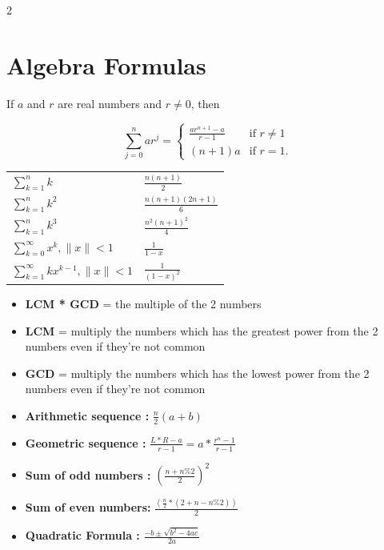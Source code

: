 \documentclass[10pt,a4paper]{extarticle}
\begin{document}
\begin{landscape}
\begin{multicols}{2}
\section{Algebra Formulas}

If $a$ and $r$ are real numbers and $r \neq 0$, then

$$\sum_{j=0}^{n} ar^j = \begin{cases} \frac{ar^{n+1}-a}{r-1} & \text{if } r \neq 1 \\ (n+1)a & \text{if } r = 1. \end{cases}$$

\begin{center}
\renewcommand{\arraystretch}{1.5}
\begin{tabular}{ll}
$\sum_{k=1}^{n} k$ & $\frac{n(n+1)}{2}$ \\
$\sum_{k=1}^{n} k^2$ & $\frac{n(n+1)(2n+1)}{6}$ \\
$\sum_{k=1}^{n} k^3$ & $\frac{n^2(n+1)^2}{4}$ \\
$\sum_{k=0}^{\infty} x^k, \|x\| < 1$ & $\frac{1}{1-x}$ \\
$\sum_{k=1}^{\infty} kx^{k-1}, \|x\| < 1$ & $\frac{1}{(1-x)^2}$ \\
\end{tabular}
\end{center}

\begin{itemize}
    \item \textbf{LCM * GCD} = the multiple of the 2 numbers
    \item \textbf{LCM} = multiply the numbers which has the greatest power from the 2 numbers even if they're not common
    \item \textbf{GCD} = multiply the numbers which has the lowest power from the 2 numbers even if they're not common
    \item \textbf{Arithmetic sequence :} $\frac{n}{2}(a + b)$
    \item \textbf{Geometric sequence :} $\frac{L*R-a}{r-1} = a * \frac{r^n-1}{r-1}$
    \item \textbf{Sum of odd numbers :} $\left(\frac{n+n\%2}{2}\right)^2$
    \item \textbf{Sum of even numbers:} $\frac{\left(\frac{n}{2}*(2+n-n\%2)\right)}{2}$
    \item \textbf{Quadratic Formula :} $\frac{-b\pm\sqrt{b^2-4ac}}{2a}$
\end{itemize}


\end{multicols}
\end{landscape}
\end{document}
